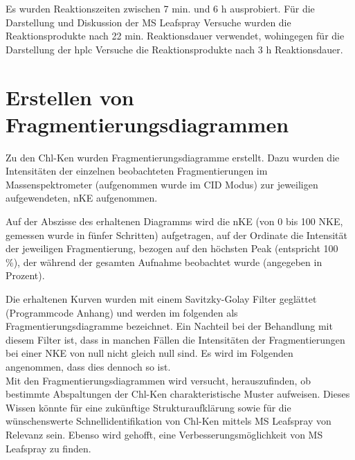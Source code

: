 Es wurden Reaktionszeiten zwischen 7 min. und 6 h ausprobiert. Für die Darstellung und Diskussion der MS Leafspray Versuche wurden die Reaktionsprodukte nach 22 min. Reaktionsdauer verwendet, wohingegen für die Darstellung der \gls{hplc} Versuche die Reaktionsprodukte nach 3 h Reaktionsdauer.

\section{Erstellen von Fragmentierungsdiagrammen} \label{sec:fragmentierungsdiagramme}

Zu den \gls{Chl-K}en wurden Fragmentierungsdiagramme erstellt. Dazu wurden die Intensitäten der einzelnen beobachteten Fragmentierungen im Massenspektrometer (aufgenommen wurde im CID Modus) zur jeweiligen aufgewendeten, \gls{nKE} aufgenommen. 

Auf der Abszisse des erhaltenen Diagramms wird die \gls{nKE} (von 0 bis 100 NKE, gemessen wurde in fünfer Schritten) aufgetragen, auf der Ordinate die Intensität der jeweiligen Fragmentierung, bezogen auf den höchsten Peak (entspricht 100 \%), der während der gesamten Aufnahme beobachtet wurde (angegeben in Prozent). 

Die erhaltenen Kurven wurden mit einem Savitzky-Golay Filter \cite{scipy} geglättet (Programmcode Anhang) und werden im folgenden als Fragmentierungsdiagramme bezeichnet. Ein Nachteil bei der Behandlung mit diesem Filter ist, dass in manchen Fällen die Intensitäten der Fragmentierungen bei einer NKE von null nicht gleich null sind. Es wird im Folgenden angenommen, dass dies dennoch so ist. \\

Mit den Fragmentierungsdiagrammen wird versucht, herauszufinden, ob bestimmte Abspaltungen der \gls{Chl-K}en charakteristische Muster aufweisen. Dieses Wissen könnte für eine zukünftige Strukturaufklärung sowie für die wünschenswerte Schnellidentifikation von \gls{Chl-K}en mittels MS Leafspray von Relevanz sein. Ebenso wird gehofft, eine Verbesserungsmöglichkeit von MS Leafspray zu finden.